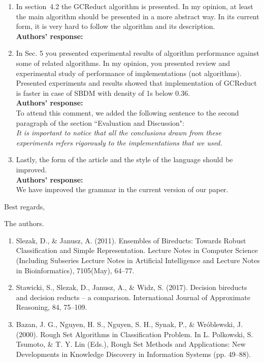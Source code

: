 \documentclass{letter}
\begin{document}
\begin{letter}{}
\begin{enumerate}
	\item In section~4.2 the GCReduct algorithm is presented. In my opinion, at least the main algorithm should be presented in a more abstract way. In its current form, it is very hard to follow the algorithm and its description.\\
	\textbf{Authors’ response:}\\

	\item In Sec. 5 you presented experimental results of algorithm performance against some of related algorithms. In my opinion, you presented review and experimental  study of performance of implementations (not algorithms). Presented experiments and results showed that implementation of GCReduct is faster in case of SBDM with density of 1s below 0.36.\\
	\textbf{Authors’ response:}\\
	To attend this comment, we added the following sentence to the second paragraph of the section ``Evaluation and Discussion":\\
	\textit{It is important to notice that all the conclusions drawn from these experiments refers rigorously to the implementations that we used.}
	
	\item Lastly, the form of the article and the style of the language should be improved.\\
	\textbf{Authors’ response:}\\
	We have improved the grammar in the current version of our paper.
	
	
  \end{enumerate}     
  
  Best regards,

  The authors.
  
\end{letter}


\begin{enumerate}
	\item Slezak, D., \& Janusz, A. (2011). Ensembles of Bireducts: Towards Robust Classification and Simple Representation. Lecture Notes in Computer Science (Including Subseries Lecture Notes in Artificial Intelligence and Lecture Notes in Bioinformatics), 7105(May), 64--77.
	
	\item Stawicki, S., Slezak, D., Janusz, A., \& Widz, S. (2017). Decision bireducts and decision reducts -- a comparison. International Journal of Approximate Reasoning, 84, 75--109.
	
	\item Bazan, J. G., Nguyen, H. S., Nguyen, S. H., Synak, P., \& Wróblewski, J. (2000). Rough Set Algorithms in Classification Problem. In L. Polkowski, S. Tsumoto, \& T. Y. Lin (Eds.), Rough Set Methods and Applications: New Developments in Knowledge Discovery in Information Systems (pp. 49--88).
\end{enumerate}
	
	

	
\end{document}
